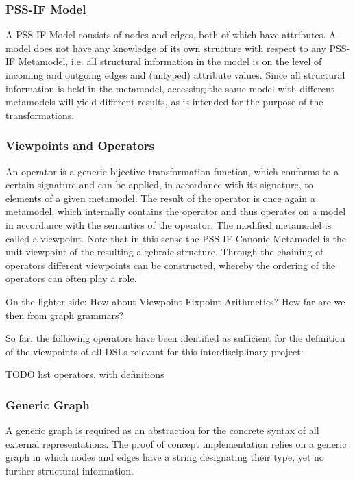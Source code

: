 \subsubsection{PSS-IF Model}

A PSS-IF Model consists of nodes and edges, both of which have attributes. A model does not have any knowledge of its own structure with respect to any PSS-IF Metamodel, i.e. all structural information in the model is on the level of incoming and outgoing edges and (untyped) attribute values. Since all structural information is held in the metamodel, accessing the same model with different metamodels will yield different results, as is intended for the purpose of the transformations.

\subsubsection{Viewpoints and Operators}

An operator is a generic bijective transformation function, which conforms to a certain signature and can be applied, in accordance with its signature, to elements of a given metamodel. The result of the operator is once again a metamodel, which internally contains the operator and thus operates on a model in accordance with the semantics of the operator. The modified metamodel is called a viewpoint. Note that in this sense the PSS-IF Canonic Metamodel is the unit viewpoint of the resulting algebraic structure. Through the chaining of operators different viewpoints can be constructed, whereby the ordering of the operators can often play a role. 

\color{red}
On the lighter side: How about Viewpoint-Fixpoint-Arithmetics? How far are we then from graph grammars?
\color{black}

So far, the following operators have been identified as sufficient for the definition of the viewpoints of all DSLs relevant for this interdisciplinary project:

\color{red}
TODO list operators, with definitions
\color{black}

\subsubsection{Generic Graph}

A generic graph is required as an abstraction for the concrete syntax of all external representations. The proof of concept implementation relies on a generic graph in which nodes and edges have a string designating their type, yet no further structural information.

